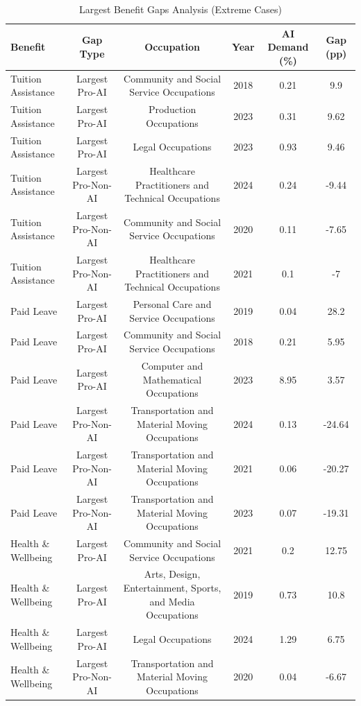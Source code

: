 \begin{table}[htbp]
\caption{Largest Benefit Gaps Analysis (Extreme Cases)}
\label{tab:largest_gaps}
\begin{tabular}{lccccc}
\hline\hline
Benefit & Gap Type & Occupation & Year & AI Demand (\%) & Gap (pp) \\
\hline
Tuition Assistance & Largest Pro-AI & Community and Social Service Occupations & 2018 & 0.21 & 9.9 \\
Tuition Assistance & Largest Pro-AI & Production Occupations & 2023 & 0.31 & 9.62 \\
Tuition Assistance & Largest Pro-AI & Legal Occupations & 2023 & 0.93 & 9.46 \\
Tuition Assistance & Largest Pro-Non-AI & Healthcare Practitioners and Technical Occupations & 2024 & 0.24 & -9.44 \\
Tuition Assistance & Largest Pro-Non-AI & Community and Social Service Occupations & 2020 & 0.11 & -7.65 \\
Tuition Assistance & Largest Pro-Non-AI & Healthcare Practitioners and Technical Occupations & 2021 & 0.1 & -7 \\
Paid Leave & Largest Pro-AI & Personal Care and Service Occupations & 2019 & 0.04 & 28.2 \\
Paid Leave & Largest Pro-AI & Community and Social Service Occupations & 2018 & 0.21 & 5.95 \\
Paid Leave & Largest Pro-AI & Computer and Mathematical Occupations & 2023 & 8.95 & 3.57 \\
Paid Leave & Largest Pro-Non-AI & Transportation and Material Moving Occupations & 2024 & 0.13 & -24.64 \\
Paid Leave & Largest Pro-Non-AI & Transportation and Material Moving Occupations & 2021 & 0.06 & -20.27 \\
Paid Leave & Largest Pro-Non-AI & Transportation and Material Moving Occupations & 2023 & 0.07 & -19.31 \\
Health \& Wellbeing & Largest Pro-AI & Community and Social Service Occupations & 2021 & 0.2 & 12.75 \\
Health \& Wellbeing & Largest Pro-AI & Arts, Design, Entertainment, Sports, and Media Occupations & 2019 & 0.73 & 10.8 \\
Health \& Wellbeing & Largest Pro-AI & Legal Occupations & 2024 & 1.29 & 6.75 \\
Health \& Wellbeing & Largest Pro-Non-AI & Transportation and Material Moving Occupations & 2020 & 0.04 & -6.67 \\

\end{tabular}
\end{table}
